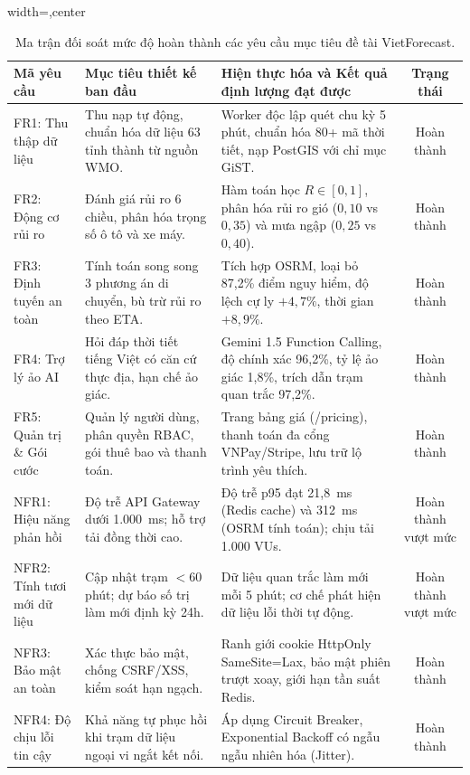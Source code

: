 \begin{table}[htbp]
\centering
\caption[Ma trận đối soát mức độ hoàn thành mục tiêu đồ án]{Ma trận đối soát mức độ hoàn thành các yêu cầu mục tiêu đề tài VietForecast.}
\label{tab:goal_fulfillment_vi}
\begin{adjustbox}{width=\textwidth,center}
\begin{tabular}{p{3.2cm}p{4.8cm}p{6.5cm}c}
\toprule
\textbf{Mã yêu cầu} & \textbf{Mục tiêu thiết kế ban đầu} & \textbf{Hiện thực hóa và Kết quả định lượng đạt được} & \textbf{Trạng thái} \\
\midrule
FR1: Thu thập dữ liệu & Thu nạp tự động, chuẩn hóa dữ liệu 63 tỉnh thành từ nguồn WMO. & Worker độc lập quét chu kỳ 5 phút, chuẩn hóa 80+ mã thời tiết, nạp PostGIS với chỉ mục GiST. & Hoàn thành \\
\addlinespace[0.4em]
FR2: Động cơ rủi ro & Đánh giá rủi ro 6 chiều, phân hóa trọng số ô tô và xe máy. & Hàm toán học $R \in [0, 1]$, phân hóa rủi ro gió ($0,10$ vs $0,35$) và mưa ngập ($0,25$ vs $0,40$). & Hoàn thành \\
\addlinespace[0.4em]
FR3: Định tuyến an toàn & Tính toán song song 3 phương án di chuyển, bù trừ rủi ro theo ETA. & Tích hợp OSRM, loại bỏ 87,2\% điểm nguy hiểm, độ lệch cự ly $+4,7\%$, thời gian $+8,9\%$. & Hoàn thành \\
\addlinespace[0.4em]
FR4: Trợ lý ảo AI & Hỏi đáp thời tiết tiếng Việt có căn cứ thực địa, hạn chế ảo giác. & Gemini 1.5 Function Calling, độ chính xác 96,2\%, tỷ lệ ảo giác 1,8\%, trích dẫn trạm quan trắc 97,2\%. & Hoàn thành \\
\addlinespace[0.4em]
FR5: Quản trị \& Gói cước & Quản lý người dùng, phân quyền RBAC, gói thuê bao và thanh toán. & Trang bảng giá (/pricing), thanh toán đa cổng VNPay/Stripe, lưu trữ lộ trình yêu thích. & Hoàn thành \\
\midrule
NFR1: Hiệu năng phản hồi & Độ trễ API Gateway dưới 1.000~ms; hỗ trợ tải đồng thời cao. & Độ trễ p95 đạt 21,8~ms (Redis cache) và 312~ms (OSRM tính toán); chịu tải 1.000 VUs. & Hoàn thành vượt mức \\
\addlinespace[0.4em]
NFR2: Tính tươi mới dữ liệu & Cập nhật trạm $< 60$ phút; dự báo số trị làm mới định kỳ 24h. & Dữ liệu quan trắc làm mới mỗi 5 phút; cơ chế phát hiện dữ liệu lỗi thời tự động. & Hoàn thành vượt mức \\
\addlinespace[0.4em]
NFR3: Bảo mật an toàn & Xác thực bảo mật, chống CSRF/XSS, kiểm soát hạn ngạch. & Ranh giới cookie HttpOnly SameSite=Lax, bảo mật phiên trượt xoay, giới hạn tần suất Redis. & Hoàn thành \\
\addlinespace[0.4em]
NFR4: Độ chịu lỗi tin cậy & Khả năng tự phục hồi khi trạm dữ liệu ngoại vi ngắt kết nối. & Áp dụng Circuit Breaker, Exponential Backoff có ngẫu ngẫu nhiên hóa (Jitter). & Hoàn thành \\
\bottomrule
\end{tabular}
\end{adjustbox}
\end{table}

